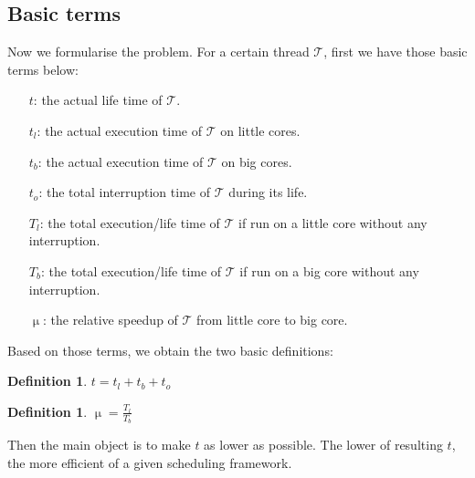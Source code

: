 \documentclass[pageno]{jpaper}
\newtheorem{definition}[theorem]{\bf Definition}
\begin{document}
\subsection{Basic terms}
Now we formularise the problem. For a certain thread $\mathcal{T}$, first we have those basic terms below:
\begin{itemize}
\item[$t$:] the actual life time of  $\mathcal{T}$.
\item[$t_l$:] the actual execution time of $\mathcal{T}$ on little cores.
\item[$t_b$:] the actual execution time of $\mathcal{T}$ on big cores.
\item[$t_o$:] the total interruption time of $\mathcal{T}$ during its life.
\item[$T_l$:] the total execution/life time of $\mathcal{T}$ if run on a little core without any interruption.
\item[$T_b$:] the total execution/life time of $\mathcal{T}$ if run on a big core without any interruption.
\item[$\upmu$:] the relative speedup of $\mathcal{T}$ from little core to big core.
\end{itemize}
Based on those terms, we obtain the two basic definitions:
\begin{definition} $t = t_l + t_b + t_o$
\end{definition}

\begin{definition} $\upmu = \frac{T_l}{T_b}$
\end{definition}

Then the main object is to make $t$ as lower as possible. The lower of resulting $t$, the more efficient of a given scheduling framework. 
\end{document}

